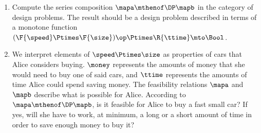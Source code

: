 \begin{gradedexercise}
    \begin{enumerate}
        \item Compute the series composition $\mapa \mthenof\DP \mapb$ in the category of design problems.
              The result should be a design problem described in terms of a monotone function $(\F{\speed} \Ptimes \F{\size})\op \Ptimes \R{\ttime} \mto \Bool$.
        \item We interpret elements of $\speed \Ptimes \size$ as properties of cars that Alice considers buying.
              $\money$ represents the amounts of money that she would need to buy one of said cars, and $\ttime$ represents the amounts of time Alice could spend saving money.
              The feasibility relations $\mapa$ and $\mapb$ describe what is possible for Alice.
              According to $\mapa \mthenof\DP \mapb$, is it feasible for Alice to buy a fast small car?
              If yes, will she have to work, at minimum, a long or a short amount of time in order to save enough money to buy it?
    \end{enumerate}
\end{gradedexercise}

